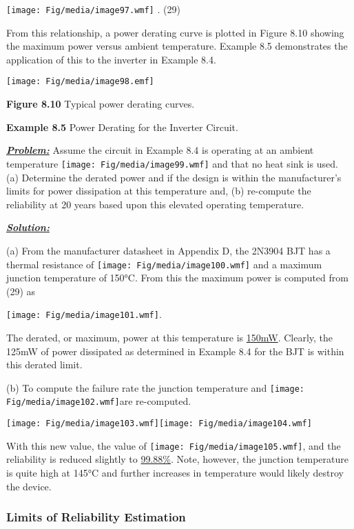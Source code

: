 \texttt{[image: Fig/media/image97.wmf]} . (29)

From this relationship, a power derating curve is plotted in Figure 8.10
showing the maximum power versus ambient temperature. Example 8.5
demonstrates the application of this to the inverter in Example 8.4.

\texttt{[image: Fig/media/image98.emf]}

\textbf{Figure 8.10} Typical power derating curves.

\textbf{Example 8.5} Power Derating for the Inverter Circuit.

\emph{\textbf{\ul{Problem:}}} Assume the circuit in Example 8.4 is
operating at an ambient temperature
\texttt{[image: Fig/media/image99.wmf]} and that no heat sink is used.
(a) Determine the derated power and if the design is within the
manufacturer's limits for power dissipation at this temperature and, (b)
re-compute the reliability at 20 years based upon this elevated
operating temperature.

\emph{\textbf{\ul{Solution:}}}

(a) From the manufacturer datasheet in Appendix D, the 2N3904 BJT has a
thermal resistance of \texttt{[image: Fig/media/image100.wmf]} and a
maximum junction temperature of 150°C. From this the maximum power is
computed from (29) as

\texttt{[image: Fig/media/image101.wmf]}.

The derated, or maximum, power at this temperature is \ul{150mW}.
Clearly, the 125mW of power dissipated as determined in Example 8.4 for
the BJT is within this derated limit.

(b) To compute the failure rate the junction temperature and
\texttt{[image: Fig/media/image102.wmf]}are re-computed.

\texttt{[image: Fig/media/image103.wmf]}\texttt{[image: Fig/media/image104.wmf]}

With this new value, the value of
\texttt{[image: Fig/media/image105.wmf]}, and the reliability is reduced
slightly to \ul{99.88\%}. Note, however, the junction temperature is
quite high at 145°C and further increases in temperature would likely
destroy the device.

\subsubsection{Limits of Reliability
Estimation}\label{limits-of-reliability-estimation}

